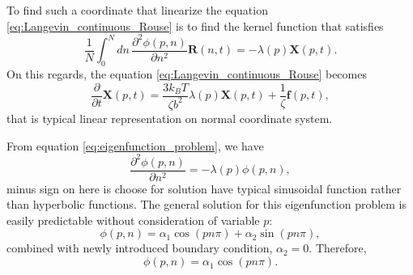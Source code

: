 \documentclass[10pt, a4paper]{article}
\begin{document}
To find such a coordinate that linearize the equation \eqref{eq:Langevin_continuous_Rouse} is to find the kernel function that satisfies
\begin{equation}
\frac{1}{N}\int_0^N dn\,\frac{\partial^2\phi(p,n)}{\partial n^2}\mathbf{R}(n,t) = -\lambda(p)\mathbf{X}(p,t).
\label{eq:eigenfunction_problem}
\end{equation}
On this regards, the equation \eqref{eq:Langevin_continuous_Rouse} becomes
\begin{equation}
\frac{\partial}{\partial t}\mathbf{X}(p,t) = \frac{3k_BT}{\zeta b^2}\lambda(p)\mathbf{X}(p,t) + \frac{1}{\zeta}\mathbf{f}(p,t),
\end{equation}
that is typical linear representation on normal coordinate system.

From equation \eqref{eq:eigenfunction_problem}, we have 
\begin{equation}
\frac{\partial^2 \phi(p,n)}{\partial n^2} = -\lambda(p)\phi(p, n),
\end{equation}
minus sign on here is choose for solution have typical sinusoidal function rather than hyperbolic functions.
The general solution for this eigenfunction problem is easily predictable without consideration of variable $p$:
\begin{equation}
\phi(p,n) = \alpha_1 \cos(pn\pi) + \alpha_2 \sin(pn\pi),
\end{equation}
combined with newly introduced boundary condition, $\alpha_2=0$.
Therefore,
\begin{equation}
\phi(p,n) = \alpha_1\cos(pn\pi).
\end{equation}


\end{document}
